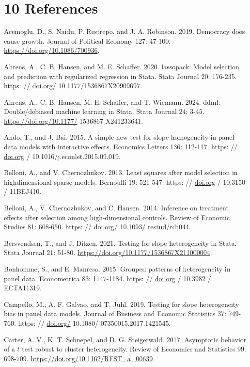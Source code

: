 \documentclass[10pt]{article}
\begin{document}
\section*{10 References}
Acemoglu, D., S. Naidu, P. Restrepo, and J. A. Robinson. 2019. Democracy does cause growth. Journal of Political Economy 127: 47-100. \href{https://doi.org/10.1086/700936}{https://doi.org/10.1086/700936}.

Ahrens, A., C. B. Hansen, and M. E. Schaffer. 2020. lassopack: Model selection and prediction with regularized regression in Stata. Stata Journal 20: 176-235. https: // \href{http://doi.org/}{doi.org/} 10.1177/1536867X20909697.

Ahrens, A., C. B. Hansen, M. E. Schaffer, and T. Wiemann. 2024. ddml: Double/debiased machine learning in Stata. Stata Journal 24: 3-45. \href{https://doi.org/10.1177/}{https://doi.org/10.1177/} 1536867 X241233641.

Ando, T., and J. Bai. 2015. A simple new test for slope homogeneity in panel data models with interactive effects. Economics Letters 136: 112-117. https: // \href{http://doi.org}{doi.org} / 10.1016/j.econlet.2015.09.019.

Belloni, A., and V. Chernozhukov. 2013. Least squares after model selection in highdimensional sparse models. Bernoulli 19: 521-547. https: // \href{http://doi.org}{doi.org} / 10.3150 / 11BEJ410.

Belloni, A., V. Chernozhukov, and C. Hansen. 2014. Inference on treatment effects after selection among high-dimensional controls. Review of Economic Studies 81: 608-650. https: // \href{http://doi.org/}{doi.org/} 10.1093/ restud/rdt044.

Bersvendsen, T., and J. Ditzen. 2021. Testing for slope heterogeneity in Stata. Stata Journal 21: 51-80. \href{https://doi.org/10.1177/1536867X211000004}{https://doi.org/10.1177/1536867X211000004}.

Bonhomme, S., and E. Manresa. 2015. Grouped patterns of heterogeneity in panel data. Econometrica 83: 1147-1184. https: // \href{http://doi.org}{doi.org} / 10.3982 / ECTA11319.

Campello, M., A. F. Galvao, and T. Juhl. 2019. Testing for slope heterogeneity bias in panel data models. Journal of Business and Economic Statistics 37: 749-760. https: // \href{http://doi.org/}{doi.org/} 10.1080/ 07350015.2017.1421545.

Carter, A. V., K. T. Schnepel, and D. G. Steigerwald. 2017. Asymptotic behavior of a $t$ test robust to cluster heterogeneity. Review of Economics and Statistics 99: 698-709. \href{https://doi.org/10.1162/REST_a_00639}{https://doi.org/10.1162/REST\_a\_00639}.
\end{document}
